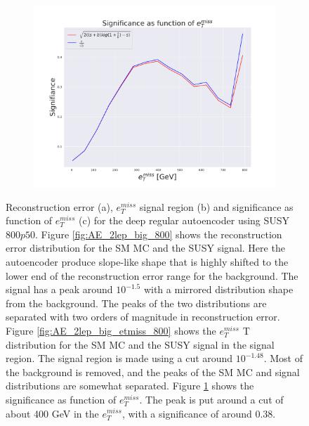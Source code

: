 \begin{figure}[!htb]
    \begin{subfigure}{.49\textwidth}
        \includegraphics[width=\textwidth]{Figures/AE_testing/big/2lep/significance_etmiss_800p0p050_-1.4833711230716062.pdf}
        \caption{}
        \label{fig:AE_2lep_big_signi_800}
    \end{subfigure}
    \hfill      
    \caption[2lep deep network | $800p50$ | AE]{Reconstruction error (a), $e_T^{miss}$ signal region (b) and significance as function of 
    $e_T^{miss}$ (c) for the deep regular autoencoder using SUSY $800p50$. 
    Figure \ref{fig:AE_2lep_big_800} shows the reconstruction error distribution for the SM MC and the SUSY signal. 
Here the autoencoder produce slope-like shape that is highly shifted to the lower end of the reconstruction error range
for the background. The signal has a peak around $10^{-1.5}$ with a mirrored distribution shape from the background. The peaks of the two distributions are separated
with two orders of magnitude in reconstruction error. Figure \ref{fig:AE_2lep_big_etmiss_800} shows the $e_T^{miss}$
T distribution for the SM MC and the SUSY signal in the signal region. The signal region is made using a cut around
$10^{-1.48}$. Most of the background is removed, and the peaks of the SM MC and signal distributions are
somewhat separated.  Figure \ref{fig:AE_2lep_big_signi_800} shows the significance as function of $e_T^{miss}$. The peak is put 
around a cut of about 400 GeV in the $e_T^{miss}$, with a significance of around $0.38$.}
    \label{fig:AE_2lep_big_rec_sig_signi_800}
\end{figure}


